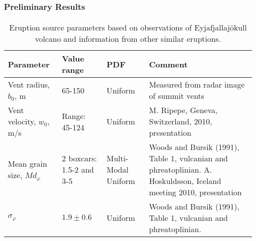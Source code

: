 \documentclass{beamer}
\begin{document}
\begin{frame}\frametitle{Preliminary Results}\framesubtitle{}
\vspace{-0.2in}
\begin{table}[htb]\footnotesize
\begin{center}\footnotesize
\caption{Eruption source parameters based on observations of
  Eyjafjallaj\"{o}kull volcano and information from other similar
  eruptions.}\label{tab1}
\begin{tabular}{|p{0.6in}|p{0.6in}|p{0.6in}|p{1.5in}|}
\hline \hline
Parameter & Value range & PDF & Comment \\
\hline \hline
Vent radius, $b_0$, m & 65-150 & Uniform & Measured from radar image of summit vents\\
\hline
Vent velocity, $w_0$, m/s & Range: 45-124 & Uniform & M. Ripepe, Geneva, Switzerland, 2010, presentation \\
\hline
Mean grain size, $Md_\varphi$ & 2 boxcars: 1.5-2 and 3-5 & Multi-Modal Uniform & Woods and Bursik (1991), Table 1, vulcanian
and phreatoplinian. A. Hoskuldsson, Iceland meeting 2010, presentation\\%
\hline
$\sigma_\varphi$ & $1.9 \pm 0.6$ & Uniform& Woods and Bursik (1991), Table 1, vulcanian
and phreatoplinian. \\
\hline \hline
\end{tabular}
\end{center}
\end{table}
\end{frame}
\end{document}
